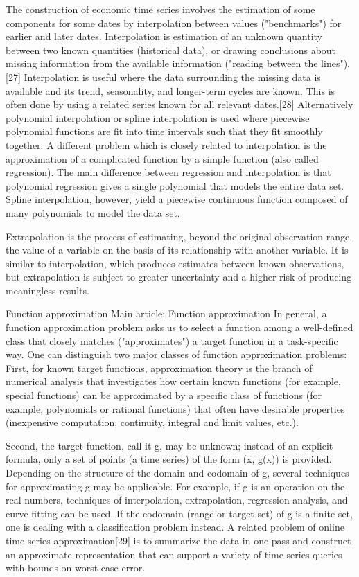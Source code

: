 The construction of economic time series involves the estimation of some components for some dates by interpolation between values ("benchmarks") for earlier and later dates. Interpolation is estimation of an unknown quantity between two known quantities (historical data), or drawing conclusions about missing information from the available information ("reading between the lines").[27] Interpolation is useful where the data surrounding the missing data is available and its trend, seasonality, and longer-term cycles are known. This is often done by using a related series known for all relevant dates.[28] Alternatively polynomial interpolation or spline interpolation is used where piecewise polynomial functions are fit into time intervals such that they fit smoothly together. A different problem which is closely related to interpolation is the approximation of a complicated function by a simple function (also called regression). The main difference between regression and interpolation is that polynomial regression gives a single polynomial that models the entire data set. Spline interpolation, however, yield a piecewise continuous function composed of many polynomials to model the data set.

Extrapolation is the process of estimating, beyond the original observation range, the value of a variable on the basis of its relationship with another variable. It is similar to interpolation, which produces estimates between known observations, but extrapolation is subject to greater uncertainty and a higher risk of producing meaningless results.

Function approximation
Main article: Function approximation
In general, a function approximation problem asks us to select a function among a well-defined class that closely matches ("approximates") a target function in a task-specific way. One can distinguish two major classes of function approximation problems: First, for known target functions, approximation theory is the branch of numerical analysis that investigates how certain known functions (for example, special functions) can be approximated by a specific class of functions (for example, polynomials or rational functions) that often have desirable properties (inexpensive computation, continuity, integral and limit values, etc.).

Second, the target function, call it g, may be unknown; instead of an explicit formula, only a set of points (a time series) of the form (x, g(x)) is provided. Depending on the structure of the domain and codomain of g, several techniques for approximating g may be applicable. For example, if g is an operation on the real numbers, techniques of interpolation, extrapolation, regression analysis, and curve fitting can be used. If the codomain (range or target set) of g is a finite set, one is dealing with a classification problem instead. A related problem of online time series approximation[29] is to summarize the data in one-pass and construct an approximate representation that can support a variety of time series queries with bounds on worst-case error.

